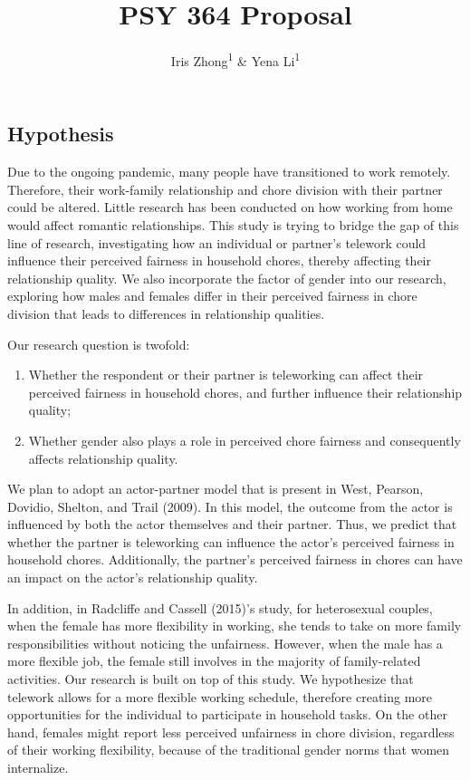\documentclass[
  english,
  man]{apa6}
\title{PSY 364 Proposal}
\author{Iris Zhong\textsuperscript{1} \& Yena Li\textsuperscript{1}}
\date{}
\affiliation{\vspace{0.5cm}\textsuperscript{1} Smith College}
\begin{document}
\maketitle

\hypertarget{hypothesis}{%
\subsection{Hypothesis}\label{hypothesis}}

Due to the ongoing pandemic, many people have transitioned to work remotely. Therefore, their work-family relationship and chore division with their partner could be altered. Little research has been conducted on how working from home would affect romantic relationships. This study is trying to bridge the gap of this line of research, investigating how an individual or partner's telework could influence their perceived fairness in household chores, thereby affecting their relationship quality. We also incorporate the factor of gender into our research, exploring how males and females differ in their perceived fairness in chore division that leads to differences in relationship qualities.

Our research question is twofold:

\begin{enumerate}
\def\labelenumi{\arabic{enumi}.}
\item
  Whether the respondent or their partner is teleworking can affect their perceived fairness in household chores, and further influence their relationship quality;
\item
  Whether gender also plays a role in perceived chore fairness and consequently affects relationship quality.
\end{enumerate}

We plan to adopt an actor-partner model that is present in West, Pearson, Dovidio, Shelton, and Trail (2009). In this model, the outcome from the actor is influenced by both the actor themselves and their partner. Thus, we predict that whether the partner is teleworking can influence the actor's perceived fairness in household chores. Additionally, the partner's perceived fairness in chores can have an impact on the actor's relationship quality.

In addition, in Radcliffe and Cassell (2015)'s study, for heterosexual couples, when the female has more flexibility in working, she tends to take on more family responsibilities without noticing the unfairness. However, when the male has a more flexible job, the female still involves in the majority of family-related activities. Our research is built on top of this study. We hypothesize that telework allows for a more flexible working schedule, therefore creating more opportunities for the individual to participate in household tasks. On the other hand, females might report less perceived unfairness in chore division, regardless of their working flexibility, because of the traditional gender norms that women internalize.
\end{document}
